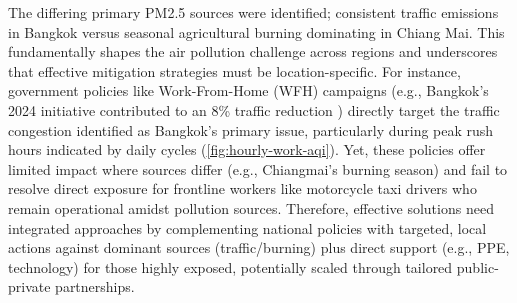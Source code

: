 The differing primary PM2.5 sources were identified; consistent traffic emissions in Bangkok versus seasonal agricultural burning dominating in Chiang Mai. 
This fundamentally shapes the air pollution challenge across regions and underscores that effective mitigation strategies must be location-specific. 
For instance, government policies like Work-From-Home (WFH) campaigns (e.g., Bangkok's 2024 initiative contributed to an 8\% traffic reduction  \cite{Wipatayotin_2025}) directly target the traffic congestion identified as Bangkok's primary issue, particularly during peak rush hours indicated by daily cycles (\autoref{fig:hourly-work-aqi}). 
Yet, these policies offer limited impact where sources differ (e.g., Chiangmai's burning season) and fail to resolve direct exposure for frontline workers like motorcycle taxi drivers who remain operational amidst pollution sources.
Therefore, effective solutions need integrated approaches by complementing national policies with targeted, local actions against dominant sources (traffic/burning) plus direct support (e.g., PPE, technology) for those highly exposed, potentially scaled through tailored public-private partnerships.



